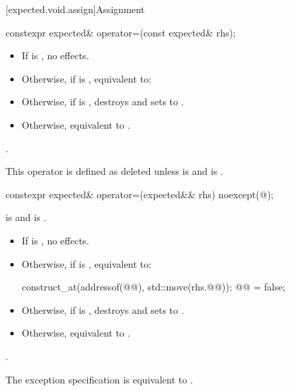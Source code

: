 [expected.void.assign]{Assignment}

%
\begin{itemdecl}
constexpr expected& operator=(const expected& rhs);
\end{itemdecl}

\begin{itemdescr}
\pnum
\effects
\begin{itemize}
\item
If  is , no effects.
\item
Otherwise, if  is ,
equivalent to: 
\item
Otherwise, if  is ,
destroys  and sets  to .
\item
Otherwise, equivalent to .
\end{itemize}

\pnum
\returns
{}.

\pnum
\remarks
This operator is defined as deleted unless
 is  and
 is .
\end{itemdescr}

%
\begin{itemdecl}
constexpr expected& operator=(expected&& rhs) noexcept(@\seebelow@);
\end{itemdecl}

\begin{itemdescr}
\pnum
\constraints
{} is  and
 is .

\pnum
\effects
\begin{itemize}
\item
If  is , no effects.
\item
Otherwise, if  is , equivalent to:
\begin{codeblock}
construct_at(addressof(@@), std::move(rhs.@@));
@@ = false;
\end{codeblock}
\item
Otherwise, if  is ,
destroys  and sets  to .
\item
Otherwise, equivalent to .
\end{itemize}

\pnum
\returns
{}.

\pnum
\remarks
The exception specification is equivalent to
.
\end{itemdescr}

